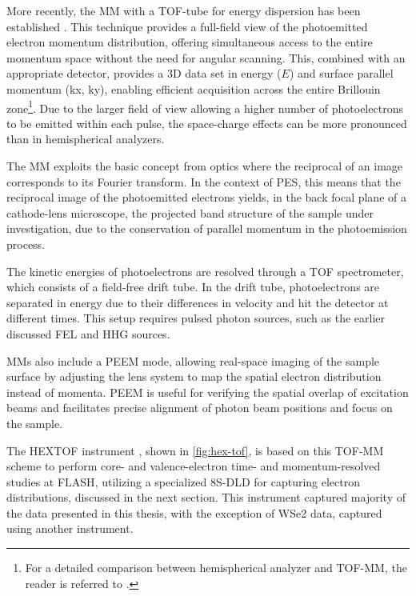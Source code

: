 More recently, the \gls{MM} with a \gls{TOF}-tube for energy dispersion has been established \cite{schonhenseSpaceTimeSpinresolved2015}. This technique provides a full-field view of the photoemitted electron momentum distribution, offering simultaneous access to the entire momentum space without the need for angular scanning. This, combined with an appropriate detector, provides a 3D data set in energy ($E$) and surface parallel momentum (\gls{kx}, \gls{ky}), enabling efficient acquisition across the entire Brillouin zone\footnote{For a detailed comparison between hemispherical analyzer and \gls{TOF}-\gls{MM}, the reader is referred to \cite{maklarQuantitativeComparisonTimeflight2020}.}. Due to the larger field of view allowing a higher number of photoelectrons to be emitted within each pulse, the space-charge effects can be more pronounced than in hemispherical analyzers.

The \gls{MM} exploits the basic concept from optics where the reciprocal of an image corresponds to its Fourier transform. In the context of \gls{PES}, this means that the reciprocal image of the photoemitted electrons yields, in the back focal plane of a cathode-lens microscope, the projected band structure of the sample under investigation, due to the conservation of parallel momentum in the photoemission process.

The kinetic energies of photoelectrons are resolved through a TOF spectrometer, which consists of a field-free drift tube. In the drift tube, photoelectrons are separated in energy due to their differences in velocity and hit the detector at different times. This setup requires pulsed photon sources, such as the earlier discussed \gls{FEL} and \gls{HHG} sources.

\Glspl{MM} also include a \gls{PEEM} mode, allowing real-space imaging of the sample surface by adjusting the lens system to map the spatial electron distribution instead of momenta. \gls{PEEM}  is useful for verifying the spatial overlap of excitation beams and facilitates precise alignment of photon beam positions and focus on the sample.

The \gls{HEXTOF} instrument \cite{kutnyakhovTimeMomentumresolvedPhotoemission2020}, shown in \cref{fig:hex-tof}, is based on this \gls{TOF}-\gls{MM} scheme to perform core- and valence-electron time- and momentum-resolved studies at \gls{FLASH}, utilizing a specialized \num{8}S-\gls{DLD} for capturing electron distributions, discussed in the next section. This instrument captured majority of the data presented in this thesis,  with the exception of \gls{WSe2} data, captured using another instrument.

